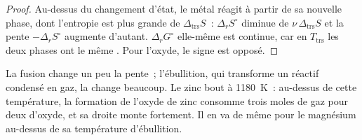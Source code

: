 \begin{proof}
Au-dessus du changement d'état, le métal réagit à partir de sa nouvelle phase, dont l'entropie est
plus grande de $\Delta_{\text{trs}}S$~: $\Delta_r S^\circ$ diminue de $\nu\,\Delta_{\text{trs}}S$
et la pente $-\Delta_r S^\circ$ augmente d'autant. $\Delta_r G^\circ$
elle-même est continue, car en $T_{\text{trs}}$ les deux phases ont le même
. Pour l'oxyde, le signe est opposé.
\end{proof}

La fusion change un peu la pente~; l'ébullition, qui transforme un réactif condensé
en gaz, la change beaucoup. Le zinc bout à \qty{1180}{K}~: au-dessus de cette
température, la formation de l'oxyde de zinc consomme trois moles de gaz pour deux d'oxyde,
et sa droite monte fortement. Il en va de même pour le magnésium au-dessus de sa
température d'ébullition.

